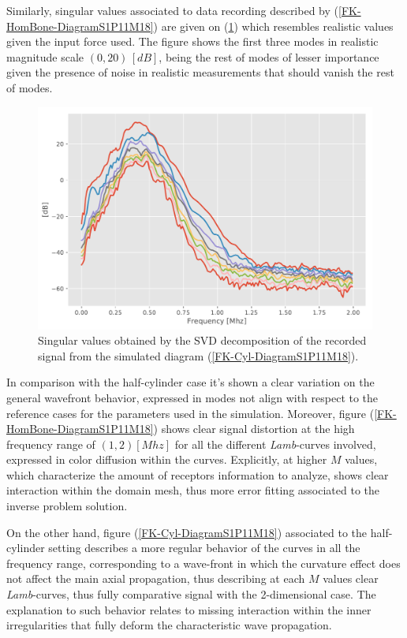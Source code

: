 Similarly, singular values associated to data recording described by (\ref{FK-HomBone-DiagramS1P11M18}) are given on (\ref{SVD-HomBone-S1P11M18}) which resembles realistic values given the input force used. The figure shows the first three modes in realistic magnitude scale $(0, 20) \, [dB]$, being the rest of modes of lesser importance given the presence of noise in realistic measurements that should vanish the rest of modes.
\begin{figure}[!h]  
	\centering
	\includegraphics[scale=.6]{images/ClusterSim/3DCorticalS1000TimeP11TransIsoFKW18_SV.pdf}
	\caption{Singular values obtained by the SVD decomposition of the recorded signal from the simulated diagram (\ref{FK-Cyl-DiagramS1P11M18}).}
	\label{SVD-HomBone-S1P11M18}
\end{figure}

In comparison with the half-cylinder case it's shown a clear variation on the general wavefront behavior, expressed in modes not align with respect to the reference cases for the parameters used in the simulation. Moreover, figure (\ref{FK-HomBone-DiagramS1P11M18}) shows clear signal distortion at the high frequency range of $(1, 2) [Mhz]$ for all the different \textit{Lamb}-curves involved, expressed in color diffusion within the curves. Explicitly, at higher $M$ values, which characterize the amount of receptors information to analyze, shows clear interaction within the domain mesh, thus more error fitting associated to the inverse problem solution.

On the other hand, figure (\ref{FK-Cyl-DiagramS1P11M18}) associated to the half-cylinder setting describes a more regular behavior of the curves in all the frequency range, corresponding to a wave-front in which the curvature effect does not affect the main axial propagation, thus describing at each $M$ values clear \textit{Lamb}-curves, thus fully comparative signal with the 2-dimensional case. The explanation to such behavior relates to missing interaction within the inner irregularities that fully deform the characteristic wave propagation.


